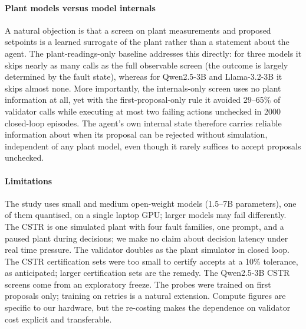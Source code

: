 \paragraph{Plant models versus model internals} A natural objection is that a screen on plant measurements and
proposed setpoints is a learned surrogate of the plant rather than a statement about the agent. The plant-readings-only
baseline addresses this directly: for three models it skips nearly as many calls as the full observable screen
(the outcome is largely determined by the fault state), whereas for Qwen2.5-3B and Llama-3.2-3B it skips almost
none. More importantly, the internals-only screen uses no plant information at all, yet with the first-proposal-only
rule it avoided 29--65\% of validator calls while executing at most two failing actions unchecked in
2000 closed-loop episodes. The agent's own internal state therefore carries reliable information about when
its proposal can be rejected without simulation, independent of any plant model, even though it rarely suffices to
accept proposals unchecked.

\paragraph{Limitations} The study uses small and medium open-weight models (1.5--7B parameters), one of them
quantised, on a single laptop GPU; larger models may fail differently. The CSTR is one simulated plant with four
fault families, one prompt, and a paused plant during decisions; we make no claim about decision latency under real
time pressure. The validator doubles as the plant simulator in closed loop. The CSTR certification sets were too small
to certify accepts at a 10\% tolerance, as anticipated; larger certification sets are the remedy. The Qwen2.5-3B CSTR
screens come from an exploratory freeze. The probes were trained on first proposals only; training on retries is a
natural extension. Compute figures are specific to our hardware, but the re-costing makes the dependence on
validator cost explicit and transferable.
